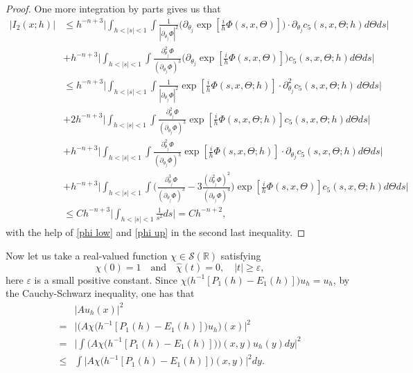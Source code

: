 \documentclass[12pt,reqno]{amsart}
\renewcommand{\epsilon}{\varepsilon}
\numberwithin{equation}{section}
\begin{document}
\begin{proof}
One more integration by parts gives us that
\begin{align}
\Big| {I}_2 (x; h) \Big|
&\leq h^{-n+3}\Big|\int_{h<|s|<1} \int \frac{1}{|\partial_{\theta_j} \Phi|^2} \big(\partial_{\theta_j} \exp[\frac{i}h  \Phi(s,x,\Theta)]\big)  \cdot \partial_{\theta_j}c_5(s, x, \Theta; h) d\Theta ds\Big| \nonumber\\
&+ h^{-n+3} \Big|\int_{h<|s|<1} \int \frac{\partial^2_{\theta_j}\Phi }{(\partial_{\theta_j} \Phi)^3}  \big(\partial_{\theta_j} \exp[\frac{i}h  \Phi(s,x,\Theta)]\big) c_5(s, x, \Theta; h) d\Theta ds\Big| \nonumber\\
&\leq h^{-n+3}\Big|\int_{h<|s|<1} \int \frac{1}{|\partial_{\theta_j} \Phi|^2} \exp[\frac{i}h  \Phi(s, x, \Theta; h)]  \cdot \partial^2_{\theta_j}c_5(s, x, \Theta; h) \, d\Theta ds\Big| \nonumber\\
&+2 h^{-n+3}\Big|\int_{h<|s|<1} \int \frac{\partial_{\theta_j}^2\Phi}{(\partial_{\theta_j} \Phi)^3}  \exp[\frac{i}h  \Phi(s, x, \Theta; h)] c_5(s, x, \Theta; h) d\Theta ds\Big| \nonumber\\
&+h^{-n+3}\Big|\int_{h<|s|<1} \int \frac{\partial_{\theta_j}^2\Phi}{(\partial_{\theta_j} \Phi)^3}  \exp[\frac{i}h  \Phi(s, x, \Theta; h)] \cdot \partial_{\theta_j}c_5(s, x, \Theta; h) d\Theta ds\Big| \nonumber\\
&+ h^{-n+3} \Big|\int_{h<|s|<1} \int \big( \frac{\partial^3_{\theta_j}\Phi }{(\partial_{\theta_j} \Phi)^3}-3 \frac{(\partial^2_{\theta_j}\Phi)^2 }{(\partial_{\theta_j} \Phi)^4} \big)  \exp[\frac{i}h  \Phi(s,x,\Theta)] c_5(s, x, \Theta; h) d\Theta ds\Big| \nonumber\\
&\leq C h^{-n+3}  \Big|\int_{h<|s|<1}\frac{1}{s^2} ds \Big|=Ch^{-n+2},
\end{align}
with the help of \eqref{phi low} and \eqref{phi up} in the second last inequality.
\end{proof}

\bigskip
Now let us take a real-valued function $\chi\in \mathcal{S}(\mathbb{R})$ satisfying
\begin{equation}\label{spt}
\chi(0)=1\quad \text{and}\quad \hat\chi(t)=0,\quad |t|\geq\epsilon,
\end{equation}
here $\epsilon$ is a small positive constant.
Since $\chi\big(h^{-1}[P_1(h)-E_1(h)]\big)u_h=u_h$, by the Cauchy-Schwarz inequality, one has that
\begin{align}\label{red1}
&\Big| A u_h (x) \Big|^2 \nonumber \\
=&\Big| \Big(A \chi \big( h^{-1}[P_1(h)-E_1(h)]\big) u_h\Big) (x) \Big|^2 \nonumber\\
=&  \Big| \int \Big(A\chi\big( h^{-1}[P_1(h)-E_1(h)]\big)\Big) (x,y) u_h(y) dy  \Big|^2  \nonumber \\
\leq &  \int \Big| A\chi\big(h^{-1}[P_1(h)-E_1(h)]\big) (x,y) \Big|^2 dy.
\end{align}
\end{document}
